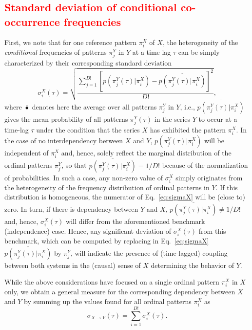 \documentclass[12pt,aip,cha,reprint,nofootinbib]{revtex4-1}
\begin{document}
\textcolor{red}{\subsection{Standard deviation of conditional co-occurrence frequencies}}
First, we note that for one reference pattern $\pi_i^{X}$ of $X$, the heterogeneity of the \emph{conditional} frequencies of patterns $\pi_{j}^{Y}$ in $Y$ at a time lag $\tau$ can be simply characterized by their corresponding standard deviation
\begin{equation}
\sigma_i^{X} (\tau) = \sqrt{\frac{\sum_{j = 1}^{D!} [p(\pi_{j}^{Y}(\tau) | \pi_i^{X}) - \overline{p(\pi_{j}^{Y}(\tau) | \pi_i^{X})}]^{2} }{D!}}, 
\label{eq:sigmaX}
\end{equation}
where $\overline{\bullet}$ denotes here the average over all patterns $\pi_{j}^{Y}$ in $Y$, i.e., $\overline{p(\pi_{j}^{Y}(\tau) | \pi_i^{X})}$ gives the mean probability of all patterns $\pi_{j}^{Y}(\tau)$ in the series $Y$ to occur at a time-lag $\tau$ under the condition that the series $X$ has exhibited the pattern $\pi_i^{X}$. In the case of no interdependency between $X$ and $Y$, $p(\pi_{j}^{Y}(\tau) | \pi_i^{X})$ will be independent of $\pi_i^{X}$ and, hence, solely reflect the marginal distribution of the ordinal patterns $\pi_j^{Y}$, so that $\overline{p(\pi_{j}^{Y}(\tau) | \pi_i^{X})}=1/D!$ because of the normalization of probabilities. In such a case, any non-zero value of $\sigma_i^{X}$ simply originates from the heterogeneity of the frequency distribution of ordinal patterns in $Y$. If this distribution is homogeneous, the numerator of Eq.~\eqref{eq:sigmaX} will be (close to) zero. In turn, if there is dependency between $Y$ and $X$, $\overline{p(\pi_{j}^{Y}(\tau) | \pi_i^{X})}\neq 1/D!$ and, hence, $\sigma_i^{X}(\tau)$ will differ from the aforementioned benchmark (independence) case. Hence, any significant deviation of $\sigma_i^{X}(\tau)$ from this benchmark, which can be computed by replacing in Eq.~\eqref{eq:sigmaX} $\overline{p(\pi_{j}^{Y}(\tau) | \pi_i^{X})}$ by $\pi_j^{Y}$, will indicate the presence of (time-lagged) coupling between both systems in the (causal) sense of $X$ determining the behavior of $Y$.

While the above considerations have focused on a single ordinal pattern $\pi_i^{X}$ in $X$ only, we obtain a general measure for the corresponding dependency between $X$ and $Y$ by summing up the values found for all ordinal patterns $\pi_i^{X}$ as
\begin{equation}
\sigma_{X\to Y} (\tau) = \sum_{i=1}^{D!} \sigma_{i}^{X} (\tau). 
\end{equation}
\end{document}
